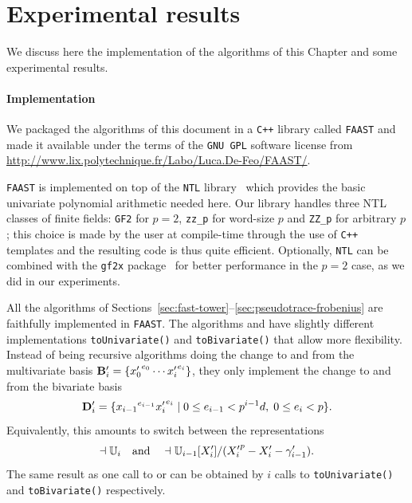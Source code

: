 \section{Experimental results}
\label{sec:artin-benchmarks}

We discuss here the implementation of the algorithms of this Chapter
and some experimental results.

\paragraph{Implementation}
We packaged the algorithms of this document in a \texttt{C++} library
called \texttt{FAAST} and made it available under the terms of the
\texttt{GNU GPL} software license from
\url{http://www.lix.polytechnique.fr/Labo/Luca.De-Feo/FAAST/}.

\texttt{FAAST} is implemented on top of the \texttt{NTL}
library~\cite{shoup2003ntl} which provides the basic univariate
polynomial arithmetic needed here. Our library handles three NTL
classes of finite fields: {\tt GF2} for $p=2$, {\tt zz\_p} for
word-size $p$ and {\tt ZZ\_p} for arbitrary $p$; this choice is made
by the user at compile-time through the use of \texttt{C++} templates
and the resulting code is thus quite efficient.  Optionally,
\texttt{NTL} can be combined with the \texttt{gf2x}
package~\cite{gf2x} for better performance in the $p=2$ case, as we
did in our experiments.

All the algorithms of
Sections~\ref{sec:fast-tower}--\ref{sec:pseudotrace-frobenius} are
faithfully implemented in \texttt{FAAST}. The algorithms
\hyperref[alg:applyisomorphism]{} and \hyperref[alg:applyinverse]{} have slightly different
implementations \texttt{toUnivariate()} and \texttt{toBivariate()}
that allow more flexibility. Instead of being recursive algorithms
doing the change to and from the multivariate basis
$\mathbf{B}'_i=\{{x_0'}^{e_0}\cdots {x_i'}^{e_i}\}$, they only
implement the change to and from the bivariate basis
\begin{equation}
  \label{eq:278}
  \mathbf{D}'_i=\{{x_{i-1}}^{e_{i-1}}{x_i'}^{e_i} \;|\;0\le
  e_{i-1}<p^{i-1}d,\; 0\le e_i<p\}
  \text{.}
\end{equation}
Equivalently, this amounts to
switch between the representations
\begin{equation}
  \dashv\mathbb{U}_i \quad\text{and}\quad
  \dashv\mathbb{U}_{i-1}[X_i']/({X_i'}^p-X_i'-\gamma_{i-1}')
  \text{.}
\end{equation}
The same result as one call to \hyperref[alg:applyisomorphism]{} or
\hyperref[alg:applyinverse]{} can be obtained by $i$ calls to
\texttt{toUnivariate()} and \texttt{toBivariate()}
respectively. 


